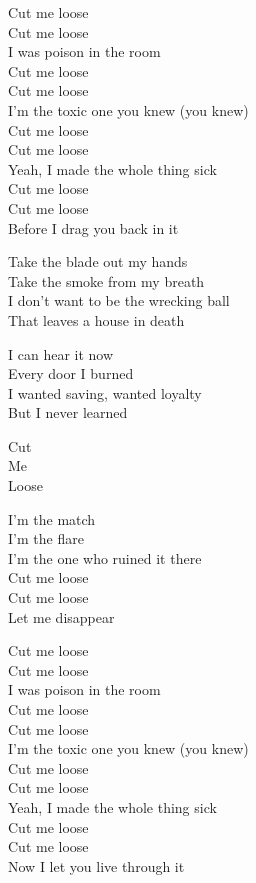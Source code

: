 \begin{lyrics}
Cut me loose\\
Cut me loose\\
I was poison in the room\\
Cut me loose\\
Cut me loose\\
I’m the toxic one you knew
(you knew)\\
Cut me loose\\
Cut me loose\\
Yeah, I made the whole thing sick\\
Cut me loose\\
Cut me loose\\
Before I drag you back in it

Take the blade out my hands\\
Take the smoke from my breath\\
I don’t want to be the wrecking ball\\
That leaves a house in death

I can hear it now\\
Every door I burned\\
I wanted saving, wanted loyalty\\
But I never learned

Cut\\
Me\\
Loose

I’m the match\\
I’m the flare\\
I’m the one who ruined it there\\
Cut me loose\\
Cut me loose\\
Let me disappear

Cut me loose\\
Cut me loose\\
I was poison in the room\\
Cut me loose\\
Cut me loose\\
I’m the toxic one you knew
(you knew)\\
Cut me loose\\
Cut me loose\\
Yeah, I made the whole thing sick\\
Cut me loose\\
Cut me loose\\
Now I let you live through it
\end{lyrics}


